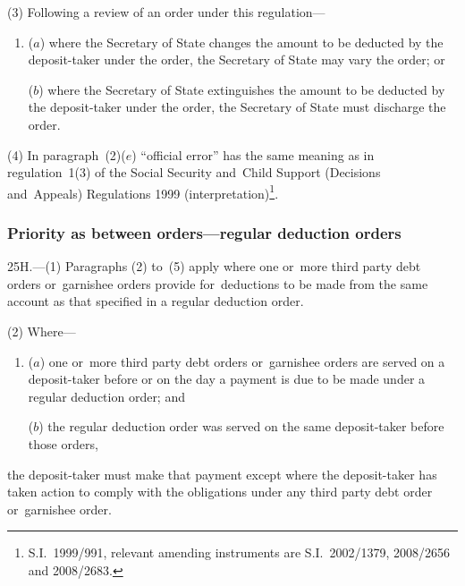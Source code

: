 \documentclass[12pt,a4paper]{article}
\begin{document}
(3) Following a review of an order under this regulation—
\begin{enumerate}\item[]
($a$) where the 
Secretary of State  %
changes the amount to be deducted by the deposit-taker under the order, 
the Secretary of State  %
may vary the order; or

($b$) where the 
Secretary of State  %
extinguishes the amount to be deducted by the deposit-taker under the order, 
the Secretary of State  %
must discharge the order.
\end{enumerate}

(4) In paragraph~(2)($e$)  “official error” has the same meaning as in regulation~1(3) of the Social Security and~Child Support (Decisions and~Appeals) Regulations 1999 (interpretation)\footnote{S.I.~1999/991, relevant amending instruments are S.I.~2002/1379, 2008/2656 and 2008/2683.}.


\subsubsection[25H. Priority as between orders---regular deduction orders]{Priority as between orders---regular deduction orders}

25H.---(1)  Paragraphs (2) to~(5) apply where one or~more third party debt orders or~garnishee orders provide for~deductions to be made from the same account as that specified in a regular deduction order.

(2) Where—
\begin{enumerate}\item[]
($a$) one or~more third party debt orders or~garnishee orders are served on a deposit-taker before or on the day a payment is due to be made under a regular deduction order; and

($b$) the regular deduction order was served on the same deposit-taker before those orders,
\end{enumerate}
the deposit-taker must make that payment except where the deposit-taker has taken action to comply with the obligations under any third party debt order or~garnishee order.
\end{document}
